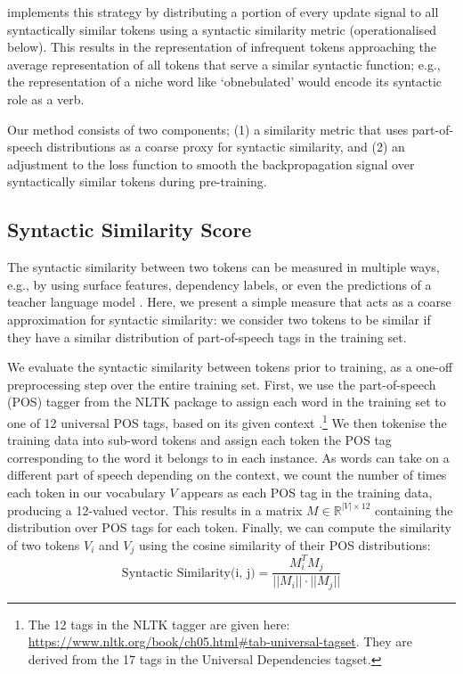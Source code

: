 \smoothing implements this strategy by distributing a portion of every update signal to all syntactically similar tokens using a syntactic similarity metric (operationalised below). This results in the representation of infrequent tokens approaching the average representation of all tokens that serve a similar syntactic function; e.g., the representation of a niche word like `obnebulated' would encode its syntactic role as a verb.

Our method consists of two components; (1) a similarity metric that uses part-of-speech distributions as a coarse proxy for syntactic similarity, and (2) an adjustment to the loss function to smooth the backpropagation signal over syntactically similar tokens during pre-training. 

\subsection{Syntactic Similarity Score}\label{sec:sim}

The syntactic similarity between two tokens can be measured in multiple ways, e.g., by using surface features, dependency labels, or even the predictions of a teacher language model \citep{hinton2015distilling}. Here, we present a simple measure that acts as a coarse approximation for syntactic similarity: we consider two tokens to be similar if they have a similar distribution of part-of-speech tags in the training set.

We evaluate the syntactic similarity between tokens prior to training, as a one-off preprocessing step over the entire training set. First, we use the part-of-speech (POS) tagger from the NLTK package \citep{bird2009natural} to assign each word in the training set to one of 12 universal POS tags, based on its given context \citep{petrov2012universalpos}.\footnote{The 12 tags in the NLTK tagger are given here: \url{https://www.nltk.org/book/ch05.html\#tab-universal-tagset}. They are derived from the 17 tags in the Universal Dependencies tagset.} We then tokenise the training data into sub-word tokens and assign each token the POS tag corresponding to the word it belongs to in each instance. As words can take on a different part of speech depending on the context, we count the number of times each token in our vocabulary $V$ appears as each POS tag in the training data, producing a 12-valued vector. This results in a matrix $M \in \mathbb{R}^{|V|\times 12}$ containing the distribution over POS tags for each token. Finally, we can compute the similarity of two tokens $V_i$ and $V_j$ using the cosine similarity of their POS distributions: $$ \text{Syntactic Similarity(i, j)} = \frac{M_i^TM_j}{||M_i|| \cdot ||M_j||}$$ 


